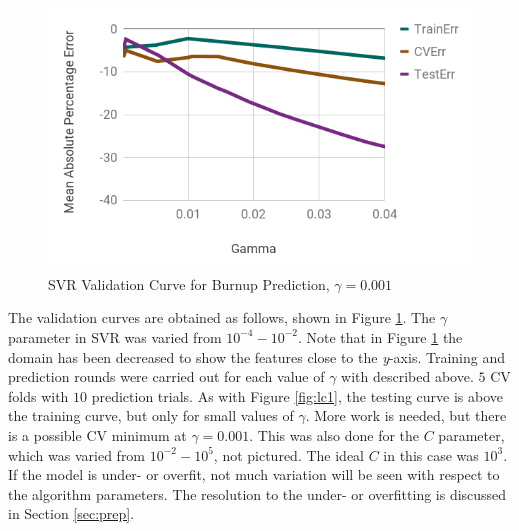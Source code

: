 \begin{figure}[!htb]
    \centering
    \includegraphics[width=\linewidth]{./chapters/demo_method/vc1.png}
    \caption{\acrshort{SVR} Validation Curve for Burnup Prediction, $\gamma = 0.001$}
    \label{fig:vc1}
\end{figure}

The validation curves are obtained as follows, shown in Figure \ref{fig:vc1}.
The $\gamma$ parameter in \gls{SVR} was varied from $10^{-4}-10^{-2}$.  Note
that in Figure \ref{fig:vc1} the domain has been decreased to show the features
close to the \textit{y}-axis.  Training and prediction rounds were carried out
for each value of $\gamma$ with described above.  $5$ \gls{CV} folds with $10$
prediction trials.  As with Figure \ref{fig:lc1}, the testing curve is above
the training curve, but only for small values of $\gamma$.  More work is
needed, but there is a possible \gls{CV} minimum at $\gamma=0.001$.  This was
also done for the $C$ parameter, which was varied from $10^{-2}-10^{5}$, not
pictured. The ideal $C$ in this case was $10^{3}$.  If the model is under- or
overfit, not much variation will be seen with respect to the algorithm
parameters. The resolution to the under- or overfitting is discussed in Section
\ref{sec:prep}.


